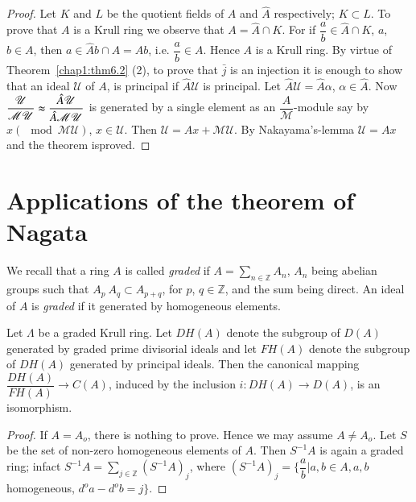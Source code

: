 \begin{proof}
Let $K$ and $L$ be the quotient fields of $A$ and $\hat{A}$
respectively; $K \subset L$. To prove that $A$ is a Krull ring we
observe that $A = \hat{A} \cap K$. For if $\dfrac{a}{b} \in \hat{A}
\cap K$, $a$, $b \in A$, then $a \in \hat{A}b \cap A = Ab$,
i.e. $\dfrac{a}{b} \in A$. Hence $A$ is a Krull ring. By virtue of
Theorem~\ref{chap1:thm6.2} (2), to prove that $\bar{j}$ is an
injection it is 
enough to show that an ideal $\mathscr{U}$ of $A$, is principal if
$\hat{A} \mathscr{U}$ is principal. Let $\hat{A} \mathscr{U} = \hat{A}
\alpha$, $\alpha \in \hat{A}$. Now $\dfrac{\mathscr{U}}{\mathscr{M}
  \mathscr{U}} \thickapprox \dfrac{\hat{A} \mathscr{U}}{\hat{A}
  \mathscr{M} \mathscr{U}}$ is generated by a single element as an
$\dfrac{A}{\mathscr{M}}$-module say by $x (\mod \mathscr{M}
\mathscr{U})$, $x \in \mathscr{U}$. Then $\mathscr{U} = Ax + \mathscr{M}
\mathscr{U}$. By Nakayama's-lemma $\mathscr{U} = Ax$ and the theorem
is\pageoriginale proved. 
\end{proof}  
  

\section{Applications of the theorem of Nagata}\label{chap1:sec7}%
    We recall that a ring $A$ is called \textit{graded} if $A =
  \sum\limits_{n \in \mathbb{Z}} A_n$, $A_n$  being abelian groups
  such that $A_p ~ A_q \subset A_{p+q}$, for $p$, $q \in \mathbb{Z}$,
  and the sum being direct. An ideal of $A$ is \textit{graded} if it
  generated by homogeneous elements. 

\begin{prop}\label{chap1:prop7.1} %
Let $\Lambda$ be a graded Krull ring. Let $DH(A)$ denote the 
  subgroup of $D(A)$ generated by graded prime divisorial ideals and 
  let $FH(A)$ denote the subgroup of $DH(A)$ generated by principal
  ideals. Then the canonical mapping $\dfrac{DH(A)}{FH(A)} \rightarrow
  C(A)$, induced by the inclusion $i : DH(A) \rightarrow D(A)$, is an
  isomorphism. 
\end{prop}  
  
\begin{proof}
If $A = A_o$, there is nothing to prove. Hence we may assume $A \neq
A_o$. Let $S$ be the set of non-zero homogeneous elements of $A$. Then
$S^{-1} A$ is again a graded ring; infact $S^{-1} A = \sum\limits_{j
  \in \mathbb{Z}} (S^{-1} A)_j$, where $(S^{-1}A)_j =
\big\{\dfrac{a}{b} \big| a, b \in A, a, b$ homogeneous, $d^o a - d^o
b = j \big \}$. 
  \end{proof}  
  
